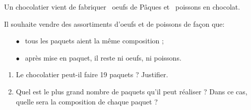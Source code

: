
\medskip

Un chocolatier vient de fabriquer ~oeufs de Pâques et ~poissons en chocolat.

Il souhaite vendre des assortiments d'oeufs et de poissons de façon que:

\setlength\parindent{6mm}
\begin{itemize}
\item[$\bullet~~$] tous les paquets aient la même composition ;
\item[$\bullet~~$] après mise en paquet, il reste ni oeufs, ni poissons.
\end{itemize}
\setlength\parindent{0mm}

\medskip

\begin{enumerate}
\item Le chocolatier peut-il faire 19 paquets ? Justifier.
\item Quel est le plus grand nombre de paquets qu'il peut réaliser ? Dans ce cas, quelle
sera la composition de chaque paquet ?
\end{enumerate}

\vspace{0.5cm}

